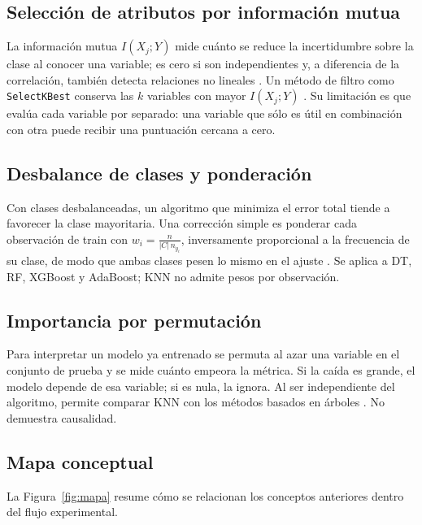 \subsection{Selección de atributos por información mutua}
La información mutua $I(X_j;Y)$ mide cuánto se reduce la incertidumbre sobre la clase
al conocer una variable; es cero si son independientes y, a diferencia de la
correlación, también detecta relaciones no lineales \cite{kraskov,ross}. Un método de
filtro como \texttt{SelectKBest} conserva las $k$ variables con mayor $I(X_j;Y)$
\cite{guyon}. Su limitación es que evalúa cada variable por separado: una variable que
sólo es útil en combinación con otra puede recibir una puntuación cercana a cero.

\subsection{Desbalance de clases y ponderación}
Con clases desbalanceadas, un algoritmo que minimiza el error total tiende a favorecer
la clase mayoritaria. Una corrección simple es ponderar cada observación de train con
$w_i=\frac{n}{|C|\,n_{y_i}}$, inversamente proporcional a la frecuencia de su clase,
de modo que ambas clases pesen lo mismo en el ajuste \cite{hegarcia}. Se aplica a DT, RF,
XGBoost y AdaBoost; KNN no admite pesos por observación.

\subsection{Importancia por permutación}
Para interpretar un modelo ya entrenado se permuta al azar una variable en el conjunto
de prueba y se mide cuánto empeora la métrica. Si la caída es grande, el modelo
depende de esa variable; si es nula, la ignora. Al ser independiente del algoritmo,
permite comparar KNN con los métodos basados en árboles \cite{breiman,sklearnperm}.
No demuestra causalidad.

\subsection{Mapa conceptual}
La Figura~\ref{fig:mapa} resume cómo se relacionan los conceptos anteriores dentro del
flujo experimental.

